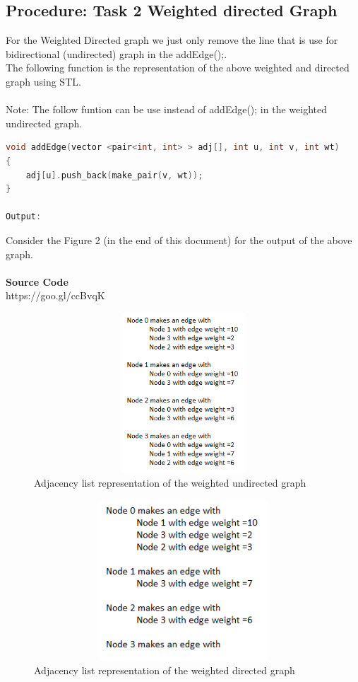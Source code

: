 \documentclass[11pt]{article}            %
\begin{document}
\subsection{Procedure: Task 2 Weighted directed Graph}
For the Weighted Directed graph we just only remove the line that is use for  bidirectional (undirected) graph in the addEdge();.\\
The following function is the representation of the above weighted and directed graph using STL.\\~\\
Note: The follow funtion can be use instead of addEdge(); in the weighted undirected graph.
\begin{lstlisting}[language=C++]
void addEdge(vector <pair<int, int> > adj[], int u, int v, int wt)
{
	adj[u].push_back(make_pair(v, wt));
}

Output:
\end{lstlisting}
Consider the Figure 2 (in the end of this document) for the output of the above graph.\\~\\

\textbf{Source Code} \\
https://goo.gl/ccBvqK

\begin{figure}[b!]
\centering
  \includegraphics[width=12cm,height=6cm,keepaspectratio]{1.png}
\caption{Adjacency list representation of the weighted undirected graph}
\label{Figure:1}    
\end{figure}

\begin{figure}[b!]
\centering
  \includegraphics[width=12cm,height=6cm,keepaspectratio]{2.png}
\caption{Adjacency list representation of the weighted directed graph}
\label{Figure:2}    
\end{figure}
\end{document}
